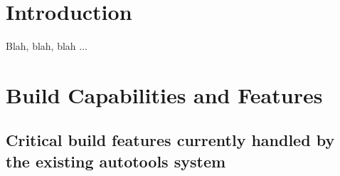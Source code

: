 \documentclass[pdf,ps2pdf,11pt]{SANDreport}
\begin{document}

%
\setcounter{secnumdepth}{3}
\SANDmain %


%
\section{Introduction}
%

Blah, blah, blah ...


%
\section{Build Capabilities and Features}
%


%
{}\subsection{Critical build features currently handled by the
existing autotools system}
%
\end{document}
